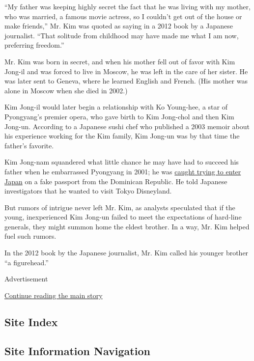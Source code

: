 ``My father was keeping highly secret the fact that he was living with
my mother, who was married, a famous movie actress, so I couldn't get
out of the house or make friends,'' Mr. Kim was quoted as saying in a
2012 book by a Japanese journalist. ``That solitude from childhood may
have made me what I am now, preferring freedom.''

Mr. Kim was born in secret, and when his mother fell out of favor with
Kim Jong-il and was forced to live in Moscow, he was left in the care of
her sister. He was later sent to Geneva, where he learned English and
French. (His mother was alone in Moscow when she died in 2002.)

Kim Jong-il would later begin a relationship with Ko Young-hee, a star
of Pyongyang's premier opera, who gave birth to Kim Jong-chol and then
Kim Jong-un. According to a Japanese sushi chef who published a 2003
memoir about his experience working for the Kim family, Kim Jong-un was
by that time the father's favorite.

Kim Jong-nam squandered what little chance he may have had to succeed
his father when he embarrassed Pyongyang in 2001; he was
\href{http://www.nytimes3xbfgragh.onion/2001/05/04/world/japan-deports-man-said-to-be-north-korean-leader-s-son.html}{caught
trying to enter Japan} on a fake passport from the Dominican Republic.
He told Japanese investigators that he wanted to visit Tokyo Disneyland.

But rumors of intrigue never left Mr. Kim, as analysts speculated that
if the young, inexperienced Kim Jong-un failed to meet the expectations
of hard-line generals, they might summon home the eldest brother. In a
way, Mr. Kim helped fuel such rumors.

In the 2012 book by the Japanese journalist, Mr. Kim called his younger
brother ``a figurehead.''

Advertisement

\protect\hyperlink{after-bottom}{Continue reading the main story}

\hypertarget{site-index}{%
\subsection{Site Index}\label{site-index}}

\hypertarget{site-information-navigation}{%
\subsection{Site Information
Navigation}\label{site-information-navigation}}

